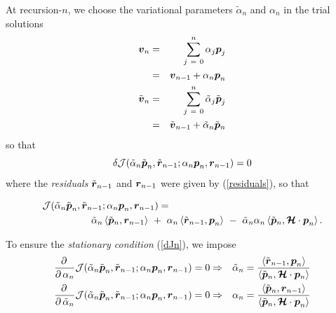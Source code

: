 At recursion-$n$, we choose the variational parameters $\tilde{ \alpha 
}_{n}$ and
${ \alpha }_{n}$ in the trial solutions
\begin{eqnarray} \label{ntrialsolutions}
{\mbox{\boldmath$\mit v$\unboldmath}}_{n}&=& \sum\limits_{  j\ =\ 0}^{ n } {\alpha }_{ 
 j}{ \mbox{\boldmath$\mit p$\unboldmath}}_{  j}\\
 &=& {\mbox{\boldmath$\mit v$\unboldmath}}_{n-1}+{ \alpha }_{n}{\mbox{\boldmath$\mit p$\unboldmath}}_{n}\nonumber\\
{\tilde{\mbox{\boldmath$\mit v$\unboldmath}}}_{n}&=& \sum\limits_{  j\ =\ 0}^{ n } 
{\tilde{\alpha }}_{  j}{\tilde{ \mbox{\boldmath$\mit p$\unboldmath}}}_{  j}\nonumber\\
&=& \tilde{\mbox{\boldmath$\mit v$\unboldmath}}{}_{n-1}+\tilde{ \alpha }{}_{n}\tilde{\mbox{\boldmath$\mit p$\unboldmath}}{}_{n}
\end{eqnarray}
so that
\begin{equation} \label{dJn}
 \delta{\cal J}({\tilde{\alpha}}_{n}{\tilde{\mbox{\boldmath$\mit p$\unboldmath}}}_{n},{\tilde{\mbox{\boldmath$\mit r$\unboldmath}}}_{n-1};
{\alpha}_{n}{{\mbox{\boldmath$\mit p$\unboldmath}}}_{n},{{\mbox{\boldmath$\mit r$\unboldmath}}}_{n-1})=0
\end{equation}
where the {\em residuals\/} ${\tilde{\mbox{\boldmath$\mit r$\unboldmath}}}_{n-1}$ and ${{\mbox{\boldmath$\mit r$\unboldmath}}}_{n-1}$
were given by (\ref{residuals}), so that
\begin{samepage}
\begin{eqnarray} \label{Jn}
\lefteqn{{\cal 
J}({\tilde{\alpha}}_{n}{\tilde{\bmi  p}}_{n},{\tilde{\bmi  r}}_{n-1};
{\alpha}_{n}{{\bmi  p}}_{n},{{\bmi  r}}_{n-1})
=}\nonumber\\
&&\qquad\qquad \tilde{\alpha}_{n}\left\langle\tilde{\bmi  p}{}_{n},{\bmi  
r}_{n-1}\right\rangle
\ +\  {\alpha}_{n} \left\langle\tilde{\bmi  r}{}_{n-1},{\bmi  
p}_{n}\right\rangle
\ - \ \tilde{\alpha}_{n} {\alpha}_{n} \left\langle\tilde{\bmi  p}{}_{n},
{\CB H} \cdot
{\bmi  p}_{n}\right\rangle.
\end{eqnarray} 
\end{samepage}
To ensure the {\em stationary condition\/} (\ref{dJn}), we impose
\begin{eqnarray} \label{an}
{\frac{ \partial   \,}{ \partial   \,{ \alpha 
}_{n}}}{\cal 
J}({\tilde{\alpha}}_{n}{\tilde{\mbox{\boldmath$\mit p$\unboldmath}}}_{n},{\tilde{\mbox{\boldmath$\mit r$\unboldmath}}}_{n-1};
{\alpha}_{n}{{\mbox{\boldmath$\mit p$\unboldmath}}}_{n},{{\mbox{\boldmath$\mit r$\unboldmath}}}_{n-1})=0 &  
\Rightarrow   & {\tilde{ \alpha 
}}_{n}={\frac{\left\langle{\tilde{\mbox{\boldmath$\mit r$\unboldmath}}{}_{n-1},{\mbox{\boldmath$\mit p$\unboldmath}}_{n} }\right\rangle}{\left\langle{\tilde{\mbox{\boldmath$\mit p$\unboldmath}}{}_{n},{\mbox{\boldmath$\cal H$\unboldmath}}
\cdot   {\mbox{\boldmath$\mit p$\unboldmath}}{}_{n}}\right\rangle}}\nonumber\\
{\frac{ \partial   \,}{ \partial   \,\tilde{ \alpha 
}_{n}}}{\cal 
J}({\tilde{\alpha}}_{n}{\tilde{\mbox{\boldmath$\mit p$\unboldmath}}}_{n},{\tilde{\mbox{\boldmath$\mit r$\unboldmath}}}_{n-1};
{\alpha}_{n}{{\mbox{\boldmath$\mit p$\unboldmath}}}_{n},{{\mbox{\boldmath$\mit r$\unboldmath}}}_{n-1})=0 &  
\Rightarrow   & {{ \alpha 
}}_{n}={\frac{\left\langle{\tilde{\mbox{\boldmath$\mit p$\unboldmath}}{}_{n},{\mbox{\boldmath$\mit r$\unboldmath}}_{n-1}}\right\rangle}{\left\langle{\tilde{\mbox{\boldmath$\mit p$\unboldmath}}{}_{n},{\mbox{\boldmath$\cal H$\unboldmath}}
\cdot   {\mbox{\boldmath$\mit p$\unboldmath}}_{n}}\right\rangle}}
\end{eqnarray} 
